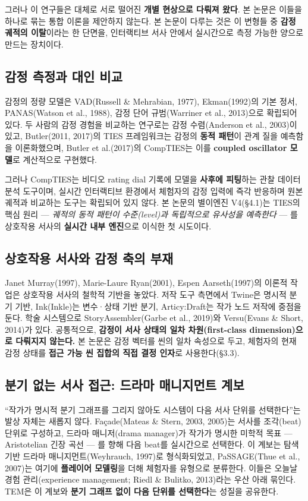 \documentclass[11pt, a4paper]{article}
\begin{document}
그러나 이 연구들은 대체로 서로 떨어진 \textbf{개별 현상으로 다뤄져 왔다}. 본 논문은 이들을 하나로 묶는 통합 이론을 제안하지 않는다. 본 논문이 다루는 것은 이 변형들 중 \textbf{감정 궤적의 이탈}이라는 한 단면을, 인터랙티브 서사 안에서 실시간으로 측정 가능한 양으로 만드는 장치이다.

\subsection{감정 측정과 대인 비교}

감정의 정량 모델은 VAD(Russell \& Mehrabian, 1977), Ekman(1992)의 기본 정서, PANAS(Watson et al., 1988), 감정 단어 규범(Warriner et al., 2013)으로 확립되어 있다. 두 사람의 감정 경험을 비교하는 연구로는 감정 수렴(Anderson et al., 2003)이 있고, Butler(2011, 2017)의 TIES 프레임워크는 감정의 \textbf{동적 패턴}이 관계 질을 예측함을 이론화했으며, Butler et al.(2017)의 CompTIES는 이를 \textbf{coupled oscillator 모델}로 계산적으로 구현했다.

그러나 CompTIES는 비디오 rating dial 기록에 모델을 \textbf{사후에 피팅}하는 관찰 데이터 분석 도구이며, 실시간 인터랙티브 환경에서 체험자의 감정 입력에 즉각 반응하며 원본 궤적과 비교하는 도구는 확립되어 있지 않다. 본 논문의 별이엔진 V4(\S4.1)는 TIES의 핵심 원리 --- \textit{궤적의 동적 패턴이 수준(level)과 독립적으로 유사성을 예측한다} --- 를 상호작용 서사의 \textbf{실시간 내부 엔진}으로 이식한 첫 시도이다.

\subsection{상호작용 서사와 감정 축의 부재}

Janet Murray(1997), Marie-Laure Ryan(2001), Espen Aarseth(1997)의 이론적 작업은 상호작용 서사의 철학적 기반을 놓았다. 저작 도구 측면에서 Twine은 명시적 분기 기반, Ink(Inkle)는 변수·상태 기반 분기, Articy:Draft는 작가 노드 저작에 중점을 둔다. 학술 시스템으로 StoryAssembler(Garbe et al., 2019)와 Versu(Evans \& Short, 2014)가 있다. 공통적으로, \textbf{감정이 서사 상태의 일차 차원(first-class dimension)으로 다뤄지지 않는다.} 본 논문은 감정 벡터를 씬의 일차 속성으로 두고, 체험자의 현재 감정 상태를 \textbf{접근 가능 씬 집합의 직접 결정 인자}로 사용한다(\S3.3).

\subsection{분기 없는 서사 접근: 드라마 매니지먼트 계보}

``작가가 명시적 분기 그래프를 그리지 않아도 시스템이 다음 서사 단위를 선택한다''는 발상 자체는 새롭지 않다. Façade(Mateas \& Stern, 2003, 2005)는 서사를 조각(beat) 단위로 구성하고, 드라마 매니저(drama manager)가 작가가 명시한 미학적 목표 --- Aristotelian 긴장 곡선 --- 를 향해 다음 beat를 실시간으로 선택한다. 이 계보는 탐색 기반 드라마 매니지먼트(Weyhrauch, 1997)로 형식화되었고, PaSSAGE(Thue et al., 2007)는 여기에 \textbf{플레이어 모델링}을 더해 체험자를 유형으로 분류한다. 이들은 오늘날 경험 관리(experience management; Riedl \& Bulitko, 2013)라는 우산 아래 묶인다. TEM은 이 계보와 \textbf{분기 그래프 없이 다음 단위를 선택한다}는 성질을 공유한다.
\end{document}
